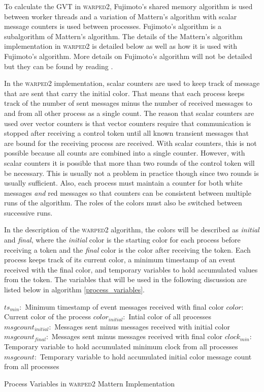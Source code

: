\documentclass[11pt]{book}
\begin{document}
To calculate the GVT in \textsc{warped2}, Fujimoto's shared memory algorithm is used between
worker threads and a variation of Mattern's algorithm with scalar message counters is used
between processes. Fujimoto's algorithm is a subalgorithm of Mattern's algorithm. The details
of the Mattern's algorithm implementation in \textsc{warped2} is detailed below as well as how
it is used with Fujimoto's algorithm. More details on Fujimoto's algorithm will not be detailed
but they can be found by reading \cite{fujimoto-94}.

In the \textsc{warped2} implementation, scalar counters are used to keep track of message
that are sent that carry the initial color. That means that each process keeps track of
the number of sent messages minus the number of received messages to and from all other
process as a single count. The reason that scalar counters are used over vector counters
is that vector counters require that communication is stopped after receiving a control token
until all known transient messages that are bound for the receiving process are received. With
scalar counters, this is not possible because all counts are combined into a single counter.
However, with scalar counters it is possible that more than two rounds of the control token will
be necessary. This is usually not a problem in practice though since two rounds is usually
sufficient. Also, each process must maintain a counter for both white messages \emph{and} red
messages so that counters can be consistent between multiple runs of the algorithm. The roles of
the colors must also be switched between successive runs.

In the description of the \textsc{warped2} algorithm, the colors will be described as
\emph{initial} and \emph{final}, where the \emph{initial} color is the starting color for each
process before receiving a token and the \emph{final} color is the color after receiving the
token. Each process keeps track of its current color, a minimum timestamp of an event received
with the final color, and temporary variables to hold accumulated values from the token. The
variables that will be used in the following discussion are listed below in algorithm
\ref{process_variables}.

\begin{algorithm}
\DontPrintSemicolon
    \boldmath$ts_{min}:$ Minimum timestamp of event messages received with final color\;
    \boldmath$color:$ Current color of the process\;
    \boldmath$color_{initial}:$ Intial color of all processes\;
    \boldmath$msgcount_{initial}:$ Messages sent minus messages received with initial color\;
    \boldmath$msgcount_{final}:$ Messages sent minus messages received with final color\;
    \boldmath$clock_{min}:$ Temporary variable to hold accumulated minimum clock from all processes\;
    \boldmath$msgcount:$ Temporary variable to hold accumulated initial color message count
        from all processes\;
\caption{Process Variables in \textsc{warped2} Mattern Implementation}\label{process_variables}
\end{algorithm}
\end{document}
